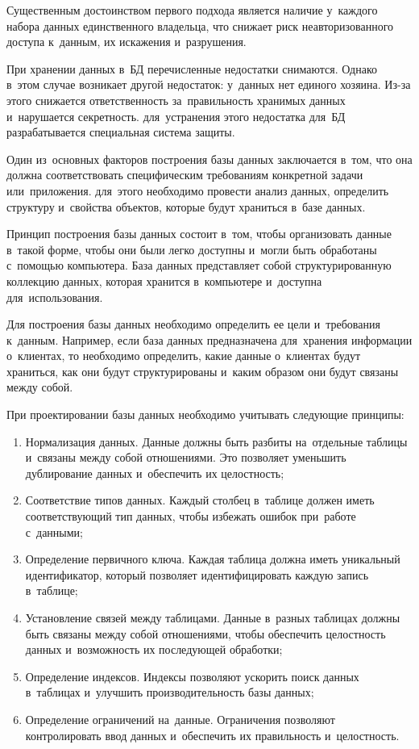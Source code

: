 \documentclass{ou}
\begin{document}
Существенным достоинством первого подхода является наличие у~каждого набора данных единственного владельца, что снижает риск неавторизованного доступа к~данным, их искажения и~разрушения.

При хранении данных в~БД перечисленные недостатки снимаются. Однако в~этом случае возникает другой недостаток: у~данных нет единого хозяина. Из-за этого снижается ответственность за~правильность хранимых данных и~нарушается секретность. для~устранения этого недостатка для~БД разрабатывается специальная система защиты.

Один из~основных факторов построения базы данных заключается в~том, что она должна соответствовать специфическим требованиям конкретной задачи или~приложения. для~этого необходимо провести анализ данных, определить структуру и~свойства объектов, которые будут храниться в~базе данных.

Принцип построения базы данных состоит в~том, чтобы организовать данные в~такой форме, чтобы они были легко доступны и~могли быть обработаны с~помощью компьютера. База данных представляет собой структурированную коллекцию данных, которая хранится в~компьютере и~доступна для~использования.

Для построения базы данных необходимо определить ее цели и~требования к~данным. Например, если база данных предназначена для~хранения информации о~клиентах, то необходимо определить, какие данные о~клиентах будут храниться, как они будут структурированы и~каким образом они будут связаны между собой.

При проектировании базы данных необходимо учитывать следующие принципы:
\begin{enumerate}[itemindent=4em, nosep, label=\arabic*)]
\item Нормализация данных. Данные должны быть разбиты на~отдельные таблицы и~связаны между собой отношениями. Это позволяет уменьшить дублирование данных и~обеспечить их целостность;
\item Соответствие типов данных. Каждый столбец в~таблице должен иметь соответствующий тип данных, чтобы избежать ошибок при~работе с~данными;
\item Определение первичного ключа. Каждая таблица должна иметь уникальный идентификатор, который позволяет идентифицировать каждую запись в~таблице;
\item Установление связей между таблицами. Данные в~разных таблицах должны быть связаны между собой отношениями, чтобы обеспечить целостность данных и~возможность их последующей обработки;
\item Определение индексов. Индексы позволяют ускорить поиск данных в~таблицах и~улучшить производительность базы данных;
\item Определение ограничений на~данные. Ограничения позволяют контролировать ввод данных и~обеспечить их правильность и~целостность.
\end{enumerate}
\end{document}
